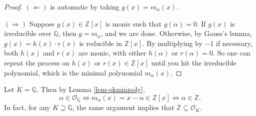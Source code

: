 \begin{proof}
\noindent $ (\Leftarrow) $ is automatic by taking $ g(x) = m_\alpha(x)$.

\noindent $ (\Rightarrow) $ Suppose $ g(x) \in \mathbb{Z}[x] $ is monic such that $ g(\alpha) = 0 $. If $ g(x) $ is irreducible over $ \mathbb{Q} $, then $ g = m_\alpha $, and we are done. Otherwise, by Gauss's lemma, $ g(x) = h(x) \cdot r(x) $ is reducible in $\mathbb{Z}[x]$. By multiplying by $-1$ if necessary, both $ h(x) $ and $ r(x) $ are monic, with either $ h(\alpha) $ or $ r(\alpha) = 0 $. So one can repeat the process on $h(x)$ or $r(x) \in \mathbb{Z}[x]$ until you hit the irreducible polynomial, which is the minimal polynomial $ m_\alpha(x)$.
\end{proof}

\begin{example} \label{eg-OQ=z}
Let $ K = \mathbb{Q} $. Then by Lemma \ref{lem-okminpoly},
$$
\alpha \in \mathcal{O}_\mathbb{Q} \iff m_\alpha(x) = x - \alpha \in \mathbb{Z}[x] \iff \alpha \in \mathbb{Z}.
$$
In fact, for any $ K \supseteq \mathbb{Q} $, the same argument implies that $ \mathbb{Z} \subseteq \mathcal{O}_K $. 
\end{example}

